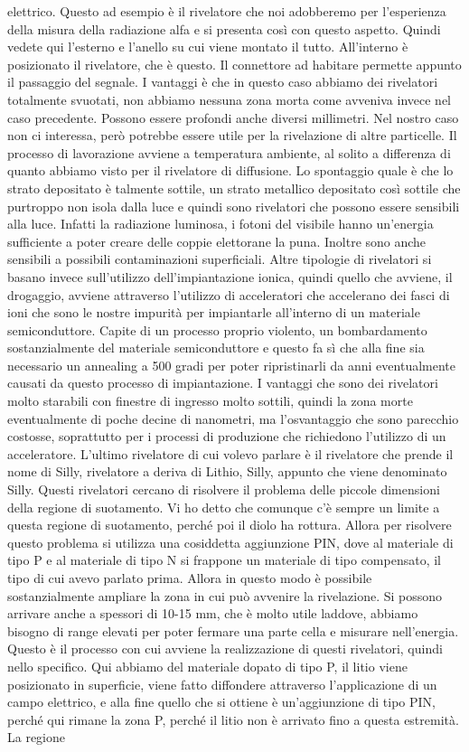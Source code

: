 elettrico. Questo ad esempio è il rivelatore che noi adobberemo per l'esperienza della misura della radiazione alfa e si presenta così con questo aspetto. Quindi vedete qui l'esterno e l'anello su cui viene montato il tutto. All'interno è posizionato il rivelatore, che è questo. Il connettore ad habitare permette appunto il passaggio del segnale. I vantaggi è che in questo caso abbiamo dei rivelatori totalmente svuotati, non abbiamo nessuna zona morta come avveniva invece nel caso precedente. Possono essere profondi anche diversi millimetri. Nel nostro caso non ci interessa, però potrebbe essere utile per la rivelazione di altre particelle. Il processo di lavorazione avviene a temperatura ambiente, al solito a differenza di quanto abbiamo visto per il rivelatore di diffusione. Lo spontaggio quale è che lo strato depositato è talmente sottile, un strato metallico depositato così sottile che purtroppo non isola dalla luce e quindi sono rivelatori che possono essere sensibili alla luce. Infatti la radiazione luminosa, i fotoni del visibile hanno un'energia sufficiente a poter creare delle coppie elettorane la puna. Inoltre sono anche sensibili a possibili contaminazioni superficiali. Altre tipologie di rivelatori si basano invece sull'utilizzo dell'impiantazione ionica, quindi quello che avviene, il drogaggio, avviene attraverso l'utilizzo di acceleratori che accelerano dei fasci di ioni che sono le nostre impurità per impiantarle all'interno di un materiale semiconduttore. Capite di un processo proprio violento, un bombardamento sostanzialmente del materiale semiconduttore e questo fa sì che alla fine sia necessario un annealing a 500 gradi per poter ripristinarli da anni eventualmente causati da questo processo di impiantazione. I vantaggi che sono dei rivelatori molto starabili con finestre di ingresso molto sottili, quindi la zona morte eventualmente di poche decine di nanometri, ma l'osvantaggio che sono parecchio costosse, soprattutto per i processi di produzione che richiedono l'utilizzo di un acceleratore. L'ultimo rivelatore di cui volevo parlare è il rivelatore che prende il nome di Silly, rivelatore a deriva di Lithio, Silly, appunto che viene denominato Silly. Questi rivelatori cercano di risolvere il problema delle piccole dimensioni della regione di suotamento. Vi ho detto che comunque c'è sempre un limite a questa regione di suotamento, perché poi il diolo ha rottura. Allora per risolvere questo problema si utilizza una cosiddetta aggiunzione PIN, dove al materiale di tipo P e al materiale di tipo N si frappone un materiale di tipo compensato, il tipo di cui avevo parlato prima. Allora in questo modo è possibile sostanzialmente ampliare la zona in cui può avvenire la rivelazione. Si possono arrivare anche a spessori di 10-15 mm, che è molto utile laddove, abbiamo bisogno di range elevati per poter fermare una parte cella e misurare nell'energia. Questo è il processo con cui avviene la realizzazione di questi rivelatori, quindi nello specifico. Qui abbiamo del materiale dopato di tipo P, il litio viene posizionato in superficie, viene fatto diffondere attraverso l'applicazione di un campo elettrico, e alla fine quello che si ottiene è un'aggiunzione di tipo PIN, perché qui rimane la zona P, perché il litio non è arrivato fino a questa estremità. La regione 